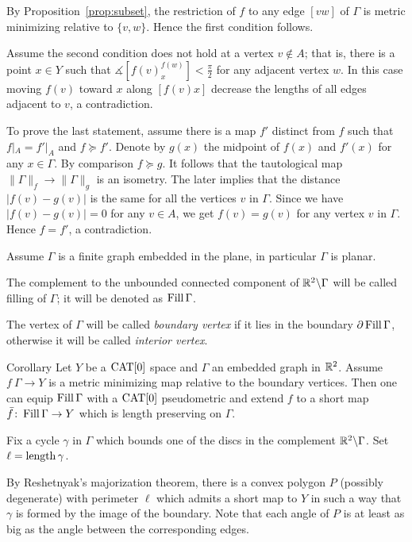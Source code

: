 \documentclass[a4paper,10pt]{amsart}
\begin{document}
By Proposition~\ref{prop:subset},
the restriction of $f$ to any edge $[vw]$ of $\Gamma$
is metric minimizing relative to $\{v,w\}$.
Hence the first condition follows.

Assume the second condition does not hold at a vertex $v\notin A$;
that is, there is a point $x\in Y$ such that
$\measuredangle[f(v)^{f(w)}_x]< \tfrac\pi2$
for any adjacent vertex $w$.
In this case moving $f(v)$ toward $x$ along $[f(v)x]$ decrease the lengths of all edges adjacent to $v$, a contradiction.

To prove the last statement, assume there is a map $f'$ distinct from $f$ such that $f|_A=f'|_A$ and $f\succcurlyeq f'$.
Denote by $g(x)$ the midpoint of $f(x)$ and $f'(x)$ for any $x\in \Gamma$. 
By comparison $f\succcurlyeq g$.
It follows that the tautological map $\|\Gamma\|_f\to \|\Gamma\|_g$ is an isometry.
The later implies that the distance $|f(v)-g(v)|$ is the same for all the vertices $v$ in $\Gamma$.
Since we have $|f(v)-g(v)|=0$ for any $v\in A$,
we get $f(v)=g(v)$ for any vertex $v$ in $\Gamma$.
Hence $f=f'$, a contradiction.
\qeds

Assume $\Gamma$ is a finite graph embedded in the plane,
in particular $\Gamma$ is planar.

The complement to the unbounded connected component of $\mathbb{R}^2\backslash\Gamma$ will be called filling of $\Gamma$;
it will be denoted as $\mathop{\rm Fill}\Gamma$.

The vertex of $\Gamma$ will be called \emph{boundary vertex}
if it lies in the boundary $\partial\mathop{\rm Fill}\Gamma$,
otherwise it will be called \emph{interior vertex}.

\begin{thm}{Corollary}\label{cor:planar-minimizing-graph}
Let $Y$ be a $\mathop{\rm CAT}\nolimits[0]$ space and
$\Gamma$ an embedded graph in $\mathbb{R}^2$.
Assume $f\:\Gamma\to Y$ is a metric minimizing map relative to the boundary vertices. 
Then 
one can equip $\mathop{\rm Fill}\Gamma$ with a $\mathop{\rm CAT}\nolimits[0]$ pseudometric 
and extend $f$ to a short map $\bar f\colon\mathop{\rm Fill}\Gamma\to Y$ which is length preserving on $\Gamma$.
\end{thm}

Fix a cycle $\gamma$ in $\Gamma$ which bounds one of the discs in the complement $\mathbb{R}^2\backslash \Gamma$.
Set $\ell=\mathop{\rm length}\nolimits\gamma$.

By Reshetnyak's majorization theorem, there is a convex polygon $P$ (possibly degenerate) with perimeter $\ell$ which admits a short map to $Y$ in such a way that $\gamma$ is formed by the image of the boundary.
Note that each angle of $P$ is at least as big as 
the angle between the corresponding edges.
\end{document}
